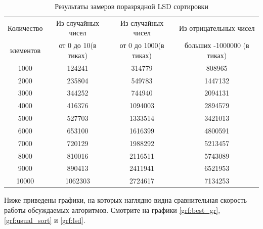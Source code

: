 \documentclass[a4paper, 14pt]{article}
\begin{document}
    \begin{table}[h]
        \caption{Результаты замеров поразрядной LSD сортировки}
            \begin{tabular}{ | c | c | c | c | }
                \hline
                 Количество   &  Из случайных чисел   &  Из случайных чисел  &  Из отрицательных чисел \\
                 элементов &  от 0 до 10(в тиках) & от 0 до 1000(в тиках) & больших -1000000 (в тиках) \\ \hline  
                    1000 &    124241   &  314779  &    808965 \\
                    2000 &    235804   &  549783  &    1447132\\
                    3000 &    344252   &  744940  &    2094131\\
                    4000 &    416376   &  1094003 &    2894579\\
                    5000 &    527703   &  1333514 &    3421013\\
                    6000 &    653100   &  1616399 &    4800591\\
                    7000 &    720129   &  1988292 &    5213457\\
                    8000 &    810016   &  2116511 &    5743089\\
                    9000 &    890413   &  2411941 &    6521953\\
                    10000&    1062303  &  2724617 &    7134253\\
                \hline
            \end{tabular}
        \label{tab:lsd_sort}
    \end{table}
    
    \newpage
   Ниже приведены графики, на которых наглядно видна сравнительная скорость работы обсуждаемых алгоритмов. Смотрите на графики \ref{grf:best_gr}, \ref{grf:usual_sort} и \ref{grf:lsd}.
 
\end{document}

